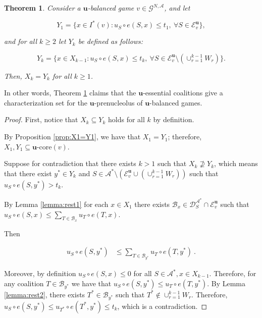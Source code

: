 \documentclass[a4paper,12pt]{article}
\newtheorem{theorem}{Theorem}
\theoremstyle{definition}
\theoremstyle{remark}
\begin{document}
\begin{theorem}\label{th:u-Huberman}
Consider a $\mathbf{u}$-balanced game $v \in \mathcal{G}^{N,\mathcal{A}}$, and let

\begin{equation*}
Y_1 = \{ x \in I^\ast (v) \colon u_S \circ e (S,x) \leq t_1, \  \forall S \in \mathcal{E}_v^{\mathbf{u}} \} ,
\end{equation*}

\noindent and for all $k \geq 2$ let $Y_k$ be defined as follows: 

\begin{equation*}
Y_k = \{ x \in X_{k-1} \colon u_S \circ e(S,x) \leq t_k, \ \forall S \in \mathcal{E}_v^{\mathbf{u}} \setminus (\cup_{r=1}^{k-1} W_r) \} .
\end{equation*}

\noindent Then, $X_k = Y_k$ for all $k\geq 1$.
\end{theorem}

In other words, Theorem \ref{th:u-Huberman} claims that the $\mathbf{u}$-essential coalitions give a characterization set for the $\mathbf{u}$-prenucleolus of $\mathbf{u}$-balanced games.

\begin{proof}
First, notice that $X_k \subseteq Y_k$ holds for all $k$ by definition.

By Proposition \ref{prop:X1=Y1}, we have that $X_1 = Y_1$; therefore, $X_1, Y_1 \subseteq \mathbf{u}\text{-core}(v)$.

Suppose for contradiction that there exists $k > 1$ such that $X_k \nsupseteq Y_k$, which means that there exist $y^\ast \in Y_k$ and $S \in \mathcal{A}^\ast \setminus (\mathcal{E}_v^{\mathbf{u}} \cup (\cup_{r=1}^{k-1} W_r))$ such that $u_S \circ e (S,y^\ast) > t_k$.  


By Lemma \ref{lemma:rest1}  for each $x\in X_1$ there exists $\mathcal{B}_x \in \mathcal{D}_S^{\mathcal{A}^{\ast}} \cap \mathcal{E}_v^{\mathbf{u}}$ such that $u_S \circ e(S, x) \leq \sum_{T \in \mathcal{B}_x} u_T \circ e (T, x)$.



Then

\begin{equation*}
\begin{split}
u_S \circ e (S, y^\ast)  &\leq \sum_{T\in \mathcal{B}_{y^*}} u_T \circ e(T, y^\ast) \ .
\end{split}
\end{equation*}

Moreover, by definition $u_S \circ e(S, x)\leq 0$ for all $S\in \mathcal{A}^{\ast}, x\in X_{k-1}$.  Therefore, for any coalition $T\in \mathcal{B}_{y^*}$ we have that $u_S \circ e(S, y^*)\leq u_T \circ e(T, y^*)$. By Lemma \ref{lemma:rest2}, there exists $T^*\in \mathcal{B}_{y^*}$ such that $T^*\notin \cup _{r=1}^{k-1}W_r$. Therefore, $u_S \circ e(S, y^*)\leq u_{T^*} \circ e(T^*, y^*)\leq t_k$, which is a contradiction.
\end{proof}
\end{document}
